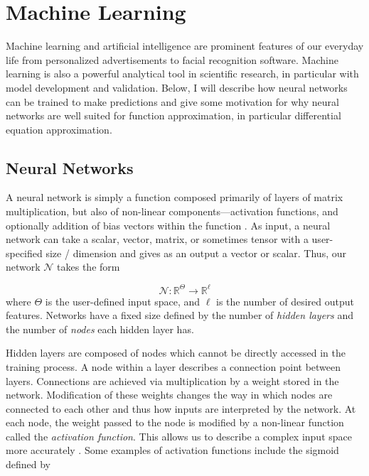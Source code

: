\documentclass{CUP-JNL-DTM}%
\theoremstyle{definition}
\numberwithin{equation}{section}
\newcommand{\net}{\mathcal{N}}
\newcommand{\Define}{\emph}
\begin{document}

\section{Machine Learning}

Machine learning and artificial intelligence are prominent features of our everyday life from personalized advertisements to facial recognition software. Machine learning is also a powerful analytical tool in scientific research, in particular with model development and validation. Below, I will describe how neural networks can be trained to make predictions and give some motivation for why neural networks are well suited for function approximation, in particular differential equation approximation. 


\subsection{Neural Networks}

A neural network is simply a function composed primarily of layers of matrix multiplication, but also of non-linear components---activation functions, and optionally addition of bias vectors within the function \cite{strangLinearAlgebraLearning2019, bishopPatternRecognitionMachine2006}. As input, a neural network can take a scalar, vector, matrix, or sometimes tensor with a user-specified size / dimension and gives as an output a vector or scalar. Thus, our network $\net$ takes the form

\begin{equation}
    \net : \mathbb{R}^{\Theta} \rightarrow \mathbb{R}^{\ell}
\end{equation}
where $\Theta$ is the user-defined input space, and $\ell$ is the number of desired output features. Networks have a fixed size defined by the number of \Define{hidden layers} and the number of \Define{nodes} each hidden layer has. 

Hidden layers are composed of nodes which cannot be directly accessed in the training process. A node within a layer describes a connection point between layers. Connections are achieved via multiplication by a weight stored in the network. Modification of these weights changes the way in which nodes are connected to each other and thus how inputs are interpreted by the network. At each node, the weight passed to the node is modified by a non-linear function called the \Define{activation function}. This allows us to describe a complex input space more accurately \cite{dubeyActivationFunctionsDeep2022a}. Some examples of activation functions include the sigmoid defined by 
\end{document}
